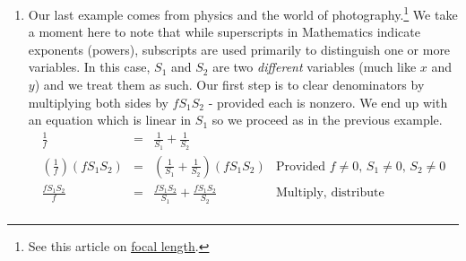 \documentclass{ximera}
\begin{document}
\begin{example}
\begin{explanation}
\begin{enumerate}
\[\begin{array}{rclr}
 x & = & \frac{2y+1}{y-3} & \\  

x(y-3) & = & \left(\frac{2y+1}{y-3}\right)(y-3) & \text{Provided $y \neq 3$} \\  

xy - 3x & = & \frac{(2y+1)\cancel{(y-3)}}{\cancel{(y-3)}} & \text{Distribute, multiply} \\  

xy - 3x & = & 2y + 1 & \\  

xy - 2y & = & 3x+1 & \text{Add $3x$, subtract $2y$} \\  

y(x-2) & = & 3x+1 & \text{Factor} \\  

y & = & \frac{3x+1}{x-2} & \text{Divide provided $x \neq 2$} \\

\end{array}\]

We highly encourage the reader to check the answer algebraically to see where the restrictions on $x$ and $y$ come into play.\footnote{It involves simplifying a compound fraction!}

\item  Our last example comes from physics and the world of photography.\footnote{See this article on \href{https://en.wikipedia.org/wiki/Focal_length}{\underline{focal length}}.}  We take a moment here to note that while superscripts in Mathematics indicate exponents (powers), subscripts are used primarily to distinguish one or more variables.  In this case, $S_1$ and $S_2$ are two \textit{different} variables (much like $x$ and $y$) and we treat them as such. Our first step is to clear denominators by multiplying both sides by $f S_1 S_2$ - provided each is nonzero.  We end up with an equation which is linear in $S_1$ so we proceed as in the previous example.  \[ \begin{array}{rclr}

\frac{1}{f} & = & \frac{1}{S_1} + \frac{1}{S_2} & \\  


\left(\frac{1}{f}\right)(fS_1S_2) & = & \left(\frac{1}{S_1} + \frac{1}{S_2}\right) (fS_1S_2) & \text{Provided $f \neq 0$, $S_1 \neq 0$, $S_2\neq 0$} \\  

\frac{fS_1S_2}{f} & = & \frac{fS_1S_2}{S_1} + \frac{fS_1S_2}{S_2} & \text{Multiply, distribute} \\  



\end{array}\]
\end{enumerate}
\end{explanation}
\end{example}
\end{document}

